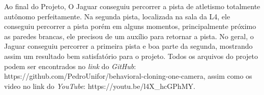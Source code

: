 Ao final do Projeto, O Jaguar conseguiu percorrer a pista de atletismo totalmente autônomo perfeitamente. Na segunda pista, localizada na sala da L4, ele conseguiu percorrer a pista porém em alguns momentos, principalmente próximo as paredes brancas, ele precisou de um auxílio para retornar a pista. No geral, o Jaguar conseguiu percorrer a primeira pista e boa parte da segunda, mostrando assim um resultado bem satisfatório para o projeto.
Todos os arquivos do projeto podem ser encontrados no \textit{link} do \textit{GitHub}: https://github.com/PedroUnifor/behavioral-cloning-one-camera, assim como os video no link do \textit{YouTube}:
https://youtu.be/l4X\_hcGPhMY.
